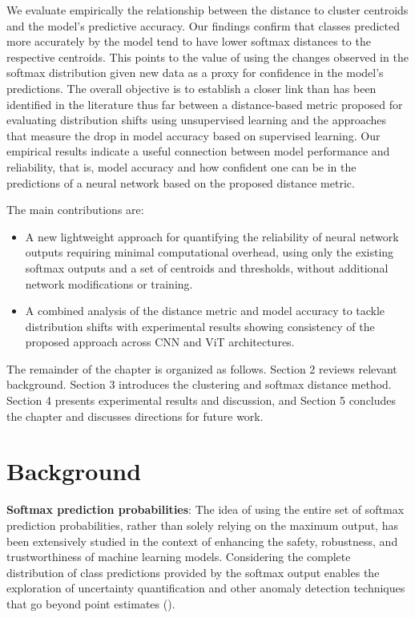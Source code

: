 We evaluate empirically the relationship between the distance to cluster centroids and the model's predictive accuracy. Our findings confirm that classes predicted more accurately by the model tend to have lower softmax distances to the respective centroids. This points to the value of using the changes observed in the softmax distribution given new data as a proxy for confidence in the model's predictions. The overall objective is to establish a closer link than has been identified in the literature thus far between a distance-based metric proposed for evaluating distribution shifts using unsupervised learning and the approaches that measure the drop in model accuracy based on supervised learning. Our empirical results indicate a useful connection between model performance and reliability, that is, model accuracy and how confident one can be in the predictions of a neural network based on the proposed distance metric. 

The main contributions are:
\begin{itemize}
\item A new lightweight approach for quantifying the reliability of neural network outputs requiring minimal computational overhead, using only the existing softmax outputs and a set of centroids and thresholds, without additional network modifications or training.
\item A combined analysis of the distance metric and model accuracy to tackle distribution shifts with experimental results showing consistency of the proposed approach across CNN and ViT architectures.
\end{itemize}

The remainder of the chapter is organized as follows. Section 2 reviews relevant background. Section 3 introduces the clustering and softmax distance method. Section 4 presents experimental results and discussion, and Section 5 concludes the chapter and discusses directions for future work.


\section{Background}

\textbf{Softmax prediction probabilities}: The idea of using the entire set of softmax prediction probabilities, rather than solely relying on the maximum output, has been extensively studied in the context of enhancing the safety, robustness, and trustworthiness of machine learning models. Considering the complete distribution of class predictions provided by the softmax output enables the exploration of uncertainty quantification and other anomaly detection techniques that go beyond point estimates (\cite{gal2016dropout}).

